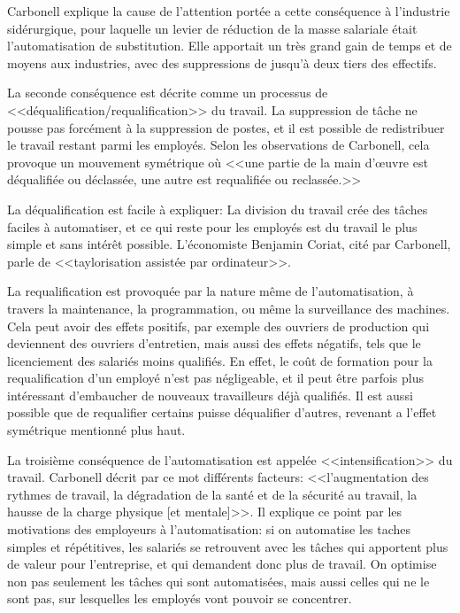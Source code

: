 \documentclass[openany, 11pt]{memoir}
\begin{document}
Carbonell explique la cause de l'attention portée a cette conséquence à l'industrie sidérurgique, pour laquelle un levier de réduction de la masse salariale était l'automatisation de substitution. Elle apportait un très grand gain de temps et de moyens aux industries, avec des suppressions de jusqu'à deux tiers des effectifs.

\bigskip
La seconde conséquence est décrite comme un processus de <<déqualification/requalification>> du travail. La suppression de tâche ne pousse pas forcément à la suppression de postes, et il est possible de redistribuer le travail restant parmi les employés. Selon les observations de Carbonell, cela provoque un mouvement symétrique où <<une partie de la main d'œuvre est déqualifiée ou déclassée, une autre est requalifiée ou reclassée.>>

La déqualification est facile à expliquer: La division du travail crée des tâches faciles à automatiser, et ce qui reste pour les employés est du travail le plus simple et sans intérêt possible. L'économiste Benjamin Coriat, cité par Carbonell, parle de <<taylorisation assistée par ordinateur>>.

La requalification est provoquée par la nature même de l'automatisation, à travers la maintenance, la programmation, ou même la surveillance des machines. Cela peut avoir des effets positifs, par exemple des ouvriers de production qui deviennent des ouvriers d'entretien, mais aussi des effets négatifs, tels que le licenciement des salariés moins qualifiés. En effet, le coût de formation pour la requalification d'un employé n'est pas négligeable, et il peut être parfois plus intéressant d'embaucher de nouveaux travailleurs déjà qualifiés. Il est aussi possible que de requalifier certains puisse déqualifier d'autres, revenant a l'effet symétrique mentionné plus haut.

\bigskip
La troisième conséquence de l'automatisation est appelée <<intensification>> du travail. Carbonell décrit par ce mot différents facteurs: <<l'augmentation des rythmes de travail, la dégradation de la santé et de la sécurité au travail, la hausse de la charge physique [et mentale]>>. Il explique ce point par les motivations des employeurs à l'automatisation: si on automatise les taches simples et répétitives, les salariés se retrouvent avec les tâches qui apportent plus de valeur pour l'entreprise, et qui demandent donc plus de travail. On optimise non pas seulement les tâches qui sont automatisées, mais aussi celles qui ne le sont pas, sur lesquelles les employés vont pouvoir se concentrer.
\end{document}
